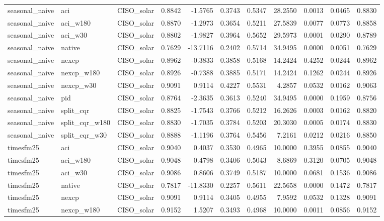\begin{tabular}{lllrrrrrrrr}
seasonal_naive & aci & CISO_solar & 0.8842 & -1.5765 & 0.3743 & 0.5347 & 28.2550 & 0.0013 & 0.0465 & 0.8830 \\
seasonal_naive & aci_w180 & CISO_solar & 0.8870 & -1.2973 & 0.3654 & 0.5211 & 27.5839 & 0.0077 & 0.0773 & 0.8858 \\
seasonal_naive & aci_w30 & CISO_solar & 0.8802 & -1.9827 & 0.3964 & 0.5652 & 29.5973 & 0.0001 & 0.0290 & 0.8789 \\
seasonal_naive & native & CISO_solar & 0.7629 & -13.7116 & 0.2402 & 0.5714 & 34.9495 & 0.0000 & 0.0051 & 0.7629 \\
seasonal_naive & nexcp & CISO_solar & 0.8962 & -0.3833 & 0.3858 & 0.5168 & 14.2424 & 0.4252 & 0.0244 & 0.8962 \\
seasonal_naive & nexcp_w180 & CISO_solar & 0.8926 & -0.7388 & 0.3885 & 0.5171 & 14.2424 & 0.1262 & 0.0244 & 0.8926 \\
seasonal_naive & nexcp_w30 & CISO_solar & 0.9091 & 0.9114 & 0.4227 & 0.5531 & 4.2857 & 0.0532 & 0.0162 & 0.9063 \\
seasonal_naive & pid & CISO_solar & 0.8764 & -2.3635 & 0.3613 & 0.5240 & 34.9495 & 0.0000 & 0.1959 & 0.8756 \\
seasonal_naive & split_cqr & CISO_solar & 0.8825 & -1.7543 & 0.3766 & 0.5212 & 16.2626 & 0.0003 & 0.0162 & 0.8820 \\
seasonal_naive & split_cqr_w180 & CISO_solar & 0.8830 & -1.7035 & 0.3784 & 0.5203 & 20.3030 & 0.0005 & 0.0174 & 0.8830 \\
seasonal_naive & split_cqr_w30 & CISO_solar & 0.8888 & -1.1196 & 0.3764 & 0.5456 & 7.2161 & 0.0212 & 0.0216 & 0.8850 \\
timesfm25 & aci & CISO_solar & 0.9040 & 0.4037 & 0.3530 & 0.4965 & 10.0000 & 0.3955 & 0.0855 & 0.9040 \\
timesfm25 & aci_w180 & CISO_solar & 0.9048 & 0.4798 & 0.3406 & 0.5043 & 8.6869 & 0.3120 & 0.0705 & 0.9048 \\
timesfm25 & aci_w30 & CISO_solar & 0.9086 & 0.8606 & 0.3749 & 0.5187 & 10.0000 & 0.0681 & 0.1536 & 0.9086 \\
timesfm25 & native & CISO_solar & 0.7817 & -11.8330 & 0.2257 & 0.5611 & 22.5658 & 0.0000 & 0.1472 & 0.7817 \\
timesfm25 & nexcp & CISO_solar & 0.9091 & 0.9114 & 0.3405 & 0.4955 & 7.9592 & 0.0532 & 0.1328 & 0.9091 \\
timesfm25 & nexcp_w180 & CISO_solar & 0.9152 & 1.5207 & 0.3493 & 0.4968 & 10.0000 & 0.0011 & 0.0856 & 0.9152 \\

\end{tabular}
